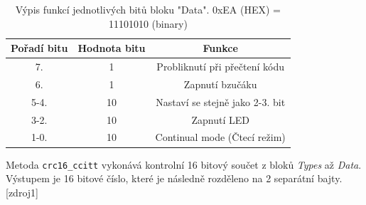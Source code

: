 \begin{table}[H]
    \centering
    \begin{tabular}{|c|c|c|}
         \hline
         Pořadí bitu & Hodnota bitu & Funkce \\ \hline
         7. & 1 & Probliknutí při přečtení kódu \\ \hline
         6. & 1 & Zapnutí bzučáku \\ \hline
         5-4. & 10 & Nastaví se stejně jako 2-3. bit \\ \hline
         3-2. & 10 & Zapnutí LED \\ \hline
         1-0. & 10 & Continual mode (Čtecí režim)\\ \hline
    \end{tabular}
    \caption{Výpis funkcí jednotlivých bitů bloku "Data". 0xEA (HEX) = 11101010 (binary)}
    \label{tab:my_label}
\end{table}

%
%
%           
%
%        

\bigskip
Metoda \texttt{crc16\_ccitt} vykonává kontrolní 16 bitový součet z bloků \textit{Types} až \textit{Data}. Výstupem je 16 bitové číslo, které je následně rozděleno na 2 separátní bajty.[zdroj1]

